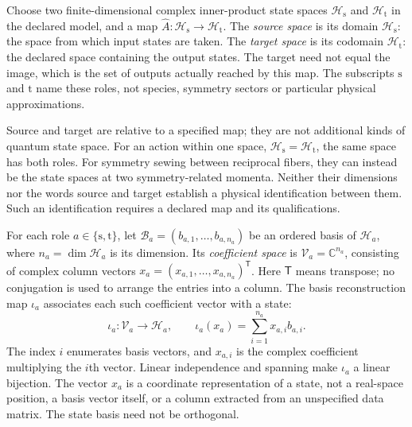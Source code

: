 \begin{definition}
\label{def:symmetry-source-target-spaces}
Choose two finite-dimensional complex inner-product state spaces
$\mathcal H_{\mathrm s}$ and $\mathcal H_{\mathrm t}$ in the declared model,
and a map $\widehat A:\mathcal H_{\mathrm s}\to\mathcal H_{\mathrm t}$.
The \emph{source space} is its domain $\mathcal H_{\mathrm s}$: the space
from which input states are taken. The \emph{target space} is its codomain
$\mathcal H_{\mathrm t}$: the declared space containing the output states.
The target need not equal the image, which is the set of outputs actually
reached by this map. The subscripts $\mathrm s$ and $\mathrm t$ name these
roles, not species, symmetry sectors or particular physical approximations.
\end{definition}

Source and target are relative to a specified map; they are not additional
kinds of quantum state space. For an action within one space,
$\mathcal H_{\mathrm s}=\mathcal H_{\mathrm t}$, the same space has both
roles. For symmetry sewing between reciprocal fibers, they can instead be
the state spaces at two symmetry-related momenta. Neither their dimensions
nor the words source and target establish a physical identification between
them. Such an identification requires a declared map and its qualifications.

\begin{definition}
\label{def:symmetry-coefficient-space}
For each role $a\in\{\mathrm s,\mathrm t\}$, let
$\mathcal B_a=(b_{a,1},\ldots,b_{a,n_a})$ be an ordered basis of
$\mathcal H_a$, where $n_a=\dim\mathcal H_a$ is its dimension. Its
\emph{coefficient space} is $\mathcal V_a=\mathbb C^{n_a}$, consisting of
complex column vectors $x_a=(x_{a,1},\ldots,x_{a,n_a})^{\mathsf T}$.
Here $\mathsf T$ means transpose; no conjugation is used to arrange the
entries into a column. The basis reconstruction map $\iota_a$ associates
each such coefficient vector with a state:
\begin{equation}
  \iota_a:\mathcal V_a\longrightarrow\mathcal H_a,
  \qquad \iota_a(x_a)=\sum_{i=1}^{n_a}x_{a,i}b_{a,i}.
  \label{eq:symmetry-basis-reconstruction}
\end{equation}
The index $i$ enumerates basis vectors, and $x_{a,i}$ is the complex
coefficient multiplying the $i$th vector. Linear independence and spanning
make $\iota_a$ a linear bijection. The vector $x_a$ is a coordinate
representation of a state, not a real-space position, a basis vector itself,
or a column extracted from an unspecified data matrix. The state basis need
not be orthogonal.
\end{definition}

